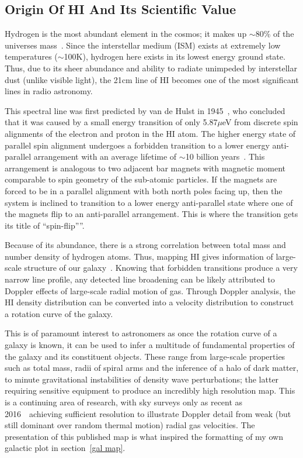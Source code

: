 \documentclass[a4paper]{jpconf}
\begin{document}
\begin{multicols}{2}
\subsection{Origin Of HI And Its Scientific Value} \label{theory}


Hydrogen is the most abundant element in the cosmos; it makes up $\sim$80\% of the universe\textquotesingle s mass~\cite{5}. Since the interstellar medium (ISM) exists at extremely low temperatures ($\sim$100K), hydrogen here exists in its lowest energy ground state. Thus, due to its sheer abundance and ability to radiate unimpeded by interstellar dust (unlike visible light), the 21cm  line of HI becomes one of the most significant lines in radio astronomy.

This spectral line was first predicted by van de Hulst in 1945~\cite{8}, who concluded that it was caused by a small energy transition of only 5.87$\mu$eV from discrete spin alignments of the electron and proton in the HI atom. The higher energy state of parallel spin alignment undergoes a forbidden transition to a lower energy anti-parallel arrangement with an average lifetime of $\sim$10 billion years~\cite{6}. This arrangement is analogous to two adjacent bar magnets with magnetic moment comparable to spin geometry of the sub-atomic particles. If the magnets are forced to be in a parallel alignment with both north poles facing up, then the system is inclined to transition to a lower energy anti-parallel state where one of the magnets flip to an anti-parallel arrangement. This is where the transition gets its title of \textquotedblleft spin-flip\textquotedblright”.

Because of its abundance, there is a strong correlation between total mass and number density of hydrogen atoms. Thus, mapping HI gives information of large-scale structure of our galaxy~\cite{1}. Knowing that forbidden transitions produce a very narrow line profile, any detected line broadening can be likely attributed to Doppler effects of large-scale radial motion of gas. Through Doppler analysis, the HI density distribution can be converted into a velocity distribution to construct a rotation curve of the galaxy.

This is of paramount interest to astronomers as once the rotation curve of a galaxy is known, it can be used to infer a multitude of fundamental properties of the galaxy and its constituent objects. These range from large-scale properties such as total mass, radii of spiral arms and the inference of a halo of dark matter, to minute gravitational instabilities of density wave perturbations; the latter requiring sensitive equipment to produce an incredibly high resolution map. This is a continuing area of research, with sky surveys only as recent as 2016~\cite{8}~achieving sufficient resolution to illustrate Doppler detail from weak (but still dominant over random thermal motion) radial gas velocities. The presentation of this published map is what inspired the formatting of my own galactic plot in section~\ref{gal map}.


\end{multicols}
\end{document}
